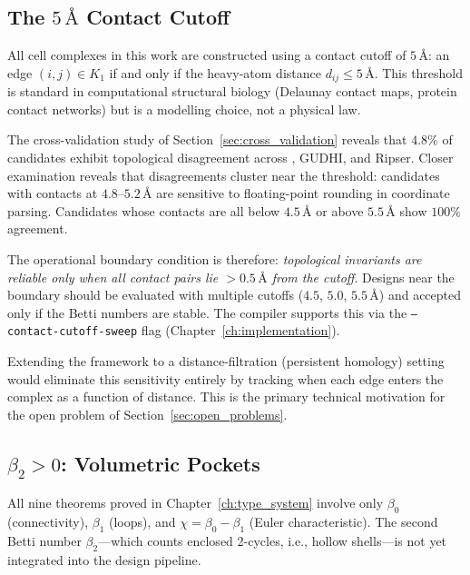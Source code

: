 \subsection{The $5\,\text{\AA}$ Contact Cutoff}
\label{subsec:cutoff_sensitivity}

All cell complexes in this work are constructed using a contact cutoff of
$5\,\text{\AA}$: an edge $(i,j) \in K_1$ if and only if the heavy-atom
distance $d_{ij} \le 5\,\text{\AA}$.  This threshold is standard in
computational structural biology (Delaunay contact maps, protein contact
networks) but is a modelling choice, not a physical law.

The cross-validation study of Section~\ref{sec:cross_validation} reveals that
$4.8\%$ of candidates exhibit topological disagreement across \PLQ{}, GUDHI,
and Ripser.  Closer examination reveals that disagreements cluster near the
threshold: candidates with contacts at $4.8$--$5.2\,\text{\AA}$ are sensitive
to floating-point rounding in coordinate parsing.  Candidates whose contacts
are all below $4.5\,\text{\AA}$ or above $5.5\,\text{\AA}$ show $100\%$
agreement.

The operational boundary condition is therefore: \emph{topological invariants
are reliable only when all contact pairs lie $> 0.5\,\text{\AA}$ from the
cutoff}.  Designs near the boundary should be evaluated with multiple cutoffs
($4.5$, $5.0$, $5.5\,\text{\AA}$) and accepted only if the Betti numbers are
stable.  The \ToposLang{} compiler supports this via the
\texttt{--contact-cutoff-sweep} flag (Chapter~\ref{ch:implementation}).

Extending the framework to a distance-filtration (persistent homology) setting
would eliminate this sensitivity entirely by tracking when each edge enters the
complex as a function of distance.  This is the primary technical motivation
for the open problem of Section~\ref{sec:open_problems}.

\subsection{$\beta_2 > 0$: Volumetric Pockets}
\label{subsec:beta2_limitation}

All nine theorems proved in Chapter~\ref{ch:type_system} involve only
$\beta_0$ (connectivity), $\beta_1$ (loops), and $\chi = \beta_0 - \beta_1$
(Euler characteristic).  The second Betti number $\beta_2$---which counts
enclosed 2-cycles, i.e., hollow shells---is not yet integrated into the design
pipeline.

